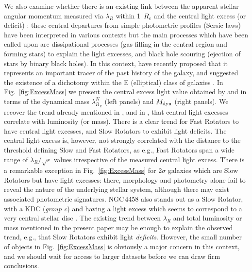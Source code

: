 \documentclass[useAMS,usenatbib,usegraphicx]{mn2e}
\begin{document}
We also examine whether there is an existing link between the 
apparent stellar angular momentum measured via $\lambda_R$ within 1~$R_e$
and the central light excess (or deficit) : these central departures from 
simple photometric profiles (Sersic laws) have been interpreted in various contexts but the main processes
which have been called upon are dissipational processes (gas filling in
the central region and forming stars) to explain the light excesses, and black
hole scouring (ejection of stars by binary black holes).
In this context, \cite{Kormendy+09} have
recently proposed that it represents an important tracer of the past history of the
galaxy, and suggested the existence of a dichotomy within the E (elliptical) class of galaxies
\citep[see also papers by][]{Khochfar+05,Hopkins+09a, Hopkins+09b, Hopkins+09c}.
In Fig.~\ref{fig:ExcessMass} we present the central excess light value 
obtained by \citet[][bottom panel]{Kormendy+09} and \citet[][top panel]{Glass+10} 
in terms of the dynamical mass ${\lambda_R^N}_e$ (left panels) and $M_{\rm dyn}$
(right panels). 
We recover the trend already mentioned in \cite{Cote+07}, \cite{Kormendy+09} and
in \cite{Glass+10}, that central light
excesses correlate with luminosity (or mass).
There is a clear trend for Fast Rotators to have central light excesses, and Slow Rotators to exhibit
light deficits. The central light excess is, however, not strongly correlated with the
distance to the threshold defining Slow and Fast Rotators, as e.g., Fast Rotators
span a wide range of $\lambda_R / \sqrt{\epsilon}$ values irrespective of the
measured central light excess. 
There is a remarkable exception in Fig.~\ref{fig:ExcessMass} for 2$\sigma$ galaxies which are Slow
Rotators but have light excesses: there, morphology and photometry alone 
fail to reveal the nature of the underlying stellar system, although there may
exist associated photometric signatures. NGC\,4458 also stands out as a Slow Rotator, with
a KDC ({\em group c}) and having a light excess which seems to correspond to a
very central stellar disc \citep{Morelli+04,Ferrarese+06}. 
The existing trend between $\lambda_R$ and total luminosity or mass mentioned in the present 
paper may be enough to explain the observed trend, e.g., that Slow Rotators exhibit light {\em
deficits}. However, the small number of objects in Fig.~\ref{fig:ExcessMass} is obviously a major concern
in this context, and we should wait for access to larger datasets before we can draw firm conclusions.

\end{document}

